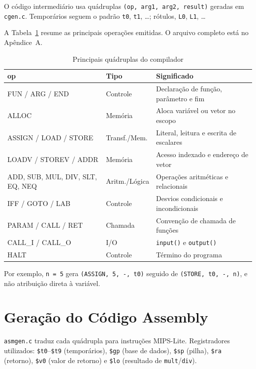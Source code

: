 \documentclass[
	12pt,				%
	openright,			%
	a4paper,			%
	english,			%
	french,				%
	spanish,			%
	brazil,				%
	]{abntex2}
\begin{document}
O código intermediário usa quádruplas \texttt{(op, arg1, arg2, result)} geradas em \texttt{cgen.c}. Temporários seguem o padrão \texttt{t0}, \texttt{t1}, \ldots; rótulos, \texttt{L0}, \texttt{L1}, \ldots

A Tabela~\ref{tab:quadruplas} resume as principais operações emitidas. O arquivo completo está no Apêndice~A.

\begin{table}[H]
\centering
\caption{Principais quádruplas do compilador}
\label{tab:quadruplas}
\small
\begin{tabular}{|l|l|p{6.5cm}|}
\hline
\textbf{op} & \textbf{Tipo} & \textbf{Significado} \\
\hline
FUN / ARG / END & Controle & Declaração de função, parâmetro e fim \\
ALLOC & Memória & Aloca variável ou vetor no escopo \\
ASSIGN / LOAD / STORE & Transf./Mem. & Literal, leitura e escrita de escalares \\
LOADV / STOREV / ADDR & Memória & Acesso indexado e endereço de vetor \\
ADD, SUB, MUL, DIV, SLT, EQ, NEQ & Aritm./Lógica & Operações aritméticas e relacionais \\
IFF / GOTO / LAB & Controle & Desvios condicionais e incondicionais \\
PARAM / CALL / RET & Chamada & Convenção de chamada de funções \\
CALL\_I / CALL\_O & I/O & \texttt{input()} e \texttt{output()} \\
HALT & Controle & Término do programa \\
\hline
\end{tabular}
\end{table}

Por exemplo, \texttt{n = 5} gera \texttt{(ASSIGN, 5, -, t0)} seguido de \texttt{(STORE, t0, -, n)}, e não atribuição direta à variável.

\section{Geração do Código Assembly}

\texttt{asmgen.c} traduz cada quádrupla para instruções MIPS-Lite. Registradores utilizados: \texttt{\$t0}--\texttt{\$t9} (temporários), \texttt{\$gp} (base de dados), \texttt{\$sp} (pilha), \texttt{\$ra} (retorno), \texttt{\$v0} (valor de retorno) e \texttt{\$lo} (resultado de \texttt{mult}/\texttt{div}).
\end{document}
